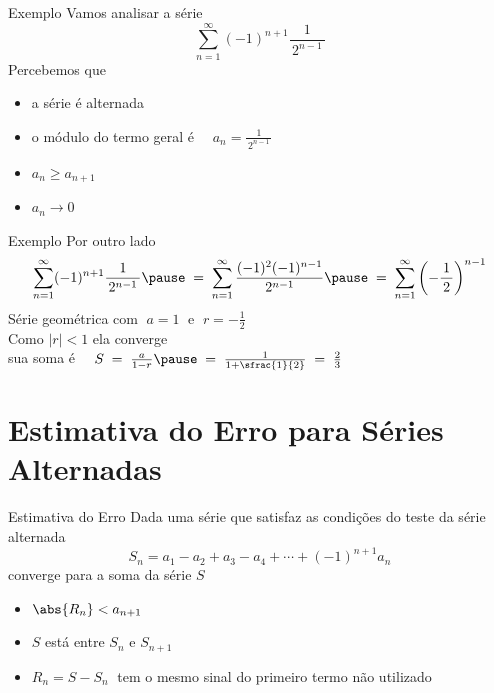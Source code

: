 \begin{frame}[t]{Exemplo}
  Vamos analisar a série
  \[ \sum_{n=1}^{\infty} (-1)^{n+1} \frac{1}{\,2^{n-1}\,} \]
  \pause
  Percebemos que
  \begin{itemize}[<+->]
    \item a série é alternada
    \item o módulo do termo geral é \(\quad a_n = \frac{1}{\,2^{n-1}\,} \)
    \item $a_n\geq a_{n+1}$
    \item $a_n\to 0$
  \end{itemize}
\end{frame}

\begin{frame}{Exemplo}
  Por outro lado
  \[
    \sum_{n=1}^{\infty} (-1)^{n+1} \frac{1}{\,2^{n-1}\,}
    \pause
    \;=\; \sum_{n=1}^{\infty} \frac{(-1)^2(-1)^{n-1}}{\,2^{n-1}\,}
    \pause
    \;=\; \sum_{n=1}^{\infty} \left( -\frac{1}{\,2\,} \right)^{n-1}
  \]
  \pause
  Série geométrica com $\;a=1\;$ e \(\;r=-\frac{1}{2}\;\) \\[5mm]

  \pause
  \vspace{0.5\baselineskip}
  Como $|r|<1$ ela converge \\[5mm]

  \pause
  sua soma é
  \(\quad
    S \;=\; \frac{a}{1-r}
      \pause
      \;=\; \frac{1}{1+\sfrac{1}{2}}
      \;=\; \frac{2}{3}
  \)

\end{frame}


\section{Estimativa do Erro para Séries Alternadas}

\begin{frame}{Estimativa do Erro}
  Dada uma série que satisfaz as condições do teste da série alternada
  \pause
  \[ S_n = a_1 - a_2 + a_3 - a_4 + \cdots + (-1)^{n+1}a_n \]
  converge para a soma da série $S$
  \pause
  \begin{itemize}[<+->]
    \item \( \abs{R_n} < a_{n+1} \)
    \item $S$ está entre $S_n$ e $S_{n+1}$
    \item \( R_n = S - S_n \;\) tem o mesmo sinal do primeiro termo não utilizado
  \end{itemize}
\end{frame}

